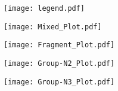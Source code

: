 \documentclass[12pt]{article}
\begin{document}
 

\begin{figure}
\begin{minipage}{8.2cm} 
\hspace{0.2cm}
\texttt{[image: legend.pdf]}
\end{minipage}
\vspace{0.1cm}
\vfill
\begin{minipage}{8cm} 
\texttt{[image: Mixed\_Plot.pdf]}
\end{minipage}
\vfill
\begin{minipage}{8cm} 
\texttt{[image: Fragment\_Plot.pdf]}
\end{minipage}
\vfill
\begin{minipage}{8cm} 
\texttt{[image: Group-N2\_Plot.pdf]}
\end{minipage}
\vfill
\begin{minipage}{9cm} 
\texttt{[image: Group-N3\_Plot.pdf]}
\end{minipage}
\end{figure}
\end{document}
